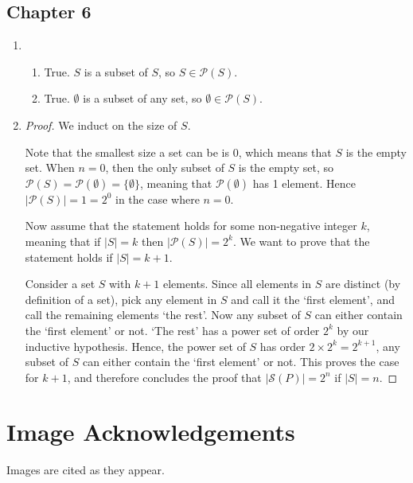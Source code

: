 \section*{Chapter 6}
\begin{enumerate}[label=(\roman*)]
    \item \begin{enumerate}[label=(\alph*)]
        \item True. $S$ is a subset of $S$, so $S \in \mathcal{P}(S)$.
        \item True. $\emptyset$ is a subset of any set, so $\emptyset \in \mathcal{P}(S)$.
    \end{enumerate}
    \item
    \begin{proof}
        We induct on the size of $S$.
        
        Note that the smallest size a set can be is 0, which means that $S$ is the empty set. When $n = 0$, then the only subset of $S$ is the empty set, so $\mathcal{P}(S) = \mathcal{P}(\emptyset) = \{\emptyset\}$, meaning that $\mathcal{P}(\emptyset)$ has 1 element. Hence $|\mathcal{P}(S)| = 1 = 2^0$ in the case where $n = 0$.
        
        Now assume that the statement holds for some non-negative integer $k$, meaning that if $|S| = k$ then $|\mathcal{P}(S)| = 2^k$. We want to prove that the statement holds if $|S| = k+1$.
        
        Consider a set $S$ with $k + 1$ elements. Since all elements in $S$ are distinct (by definition of a set), pick any element in $S$ and call it the `first element', and call the remaining elements `the rest'. Now any subset of $S$ can either contain the `first element' or not. `The rest' has a power set of order $2^k$ by our inductive hypothesis. Hence, the power set of $S$ has order $2 \times 2^k = 2^{k+1}$, any subset of $S$ can either contain the `first element' or not. This proves the case for $k+1$, and therefore concludes the proof that $|\mathcal{S}(P)| = 2^{n}$ if $|S| = n$.
    \end{proof}
\end{enumerate}

\chapter*{Image Acknowledgements}
Images are cited as they appear.

\printbibliography[heading=bibintoc, title={References and Bibliography}]


